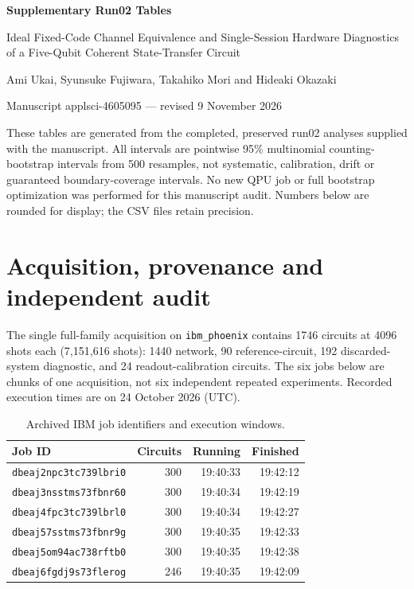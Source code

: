 \documentclass[10pt,a4paper]{article}
\begin{document}
\begin{center}
{\LARGE\bfseries Supplementary Run02 Tables}\par\vspace{6pt}
{\normalsize Ideal Fixed-Code Channel Equivalence and Single-Session Hardware Diagnostics of a Five-Qubit Coherent State-Transfer Circuit}\par\vspace{4pt}
Ami Ukai, Syunsuke Fujiwara, Takahiko Mori and Hideaki Okazaki\par
Manuscript applsci-4605095 --- revised 9 November 2026
\end{center}

These tables are generated from the completed, preserved run02 analyses supplied with the manuscript. All intervals are pointwise 95\% multinomial counting-bootstrap intervals from 500 resamples, not systematic, calibration, drift or guaranteed boundary-coverage intervals. No new QPU job or full bootstrap optimization was performed for this manuscript audit. Numbers below are rounded for display; the CSV files retain precision.
\section{Acquisition, provenance and independent audit}
The single full-family acquisition on \texttt{ibm\_phoenix} contains 1746 circuits at 4096 shots each (7,151,616 shots): 1440 network, 90 reference-circuit, 192 discarded-system diagnostic, and 24 readout-calibration circuits. The six jobs below are chunks of one acquisition, not six independent repeated experiments. Recorded execution times are on 24 October 2026 (UTC).
\par\begin{table}[htbp]\centering\small
\caption{Archived IBM job identifiers and execution windows.}\label{stab:jobs}
\begin{tabular}{lrrr}\toprule
Job ID & Circuits & Running & Finished\\\midrule
\texttt{dbeaj2npc3tc739lbri0} & 300 & 19:40:33 & 19:42:12 \\
\texttt{dbeaj3nsstms73fbnr60} & 300 & 19:40:34 & 19:42:19 \\
\texttt{dbeaj4fpc3tc739lbrl0} & 300 & 19:40:34 & 19:42:27 \\
\texttt{dbeaj57sstms73fbnr9g} & 300 & 19:40:35 & 19:42:33 \\
\texttt{dbeaj5om94ac738rftb0} & 300 & 19:40:35 & 19:42:38 \\
\texttt{dbeaj6fgdj9s73flerog} & 246 & 19:40:35 & 19:42:09 \\
\bottomrule\end{tabular}\end{table}\par
\end{document}
